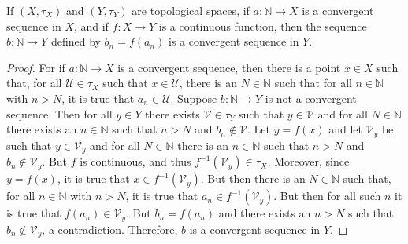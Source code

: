    \begin{theorem}
        If $(X,\tau_{X})$ and $(Y,\tau_{Y})$ are topological spaces, if
        $a:\mathbb{N}\rightarrow{X}$ is a convergent sequence in $X$, and if
        $f:X\rightarrow{Y}$ is a continuous function, then the sequence
        $b:\mathbb{N}\rightarrow{Y}$ defined by $b_{n}=f(a_{n})$ is a convergent
        sequence in $Y$.
    \end{theorem}
    \begin{proof}
        For if $a:\mathbb{N}\rightarrow{X}$ is a convergent sequence, then there
        is a point $x\in{X}$ such that, for all $\mathcal{U}\in\tau_{X}$ such
        that $x\in\mathcal{U}$, there is an $N\in\mathbb{N}$ such that for all
        $n\in\mathbb{N}$ with $n>N$, it is true that $a_{n}\in\mathcal{U}$.
        Suppose $b:\mathbb{N}\rightarrow{Y}$ is not a convergent sequence. Then
        for all $y\in{Y}$ there exists $\mathcal{V}\in\tau_{Y}$ such that
        $y\in\mathcal{V}$ and for all $N\in\mathbb{N}$ there exists an
        $n\in\mathbb{N}$ such that $n>N$ and $b_{n}\notin\mathcal{V}$. Let
        $y=f(x)$ and let $\mathcal{V}_{y}$ be such that $y\in\mathcal{V}_{y}$
        and for all $N\in\mathbb{N}$ there is an $n\in\mathbb{N}$ such that
        $n>N$ and $b_{n}\notin\mathcal{V}_{y}$. But $f$ is continuous, and thus
        $f^{\minus{1}}(\mathcal{V}_{y})\in\tau_{X}$. Moreover, since $y=f(x)$,
        it is true that $x\in{f}^{\minus{1}}(\mathcal{V}_{y})$. But then there
        is an $N\in\mathbb{N}$ such that, for all $n\in\mathbb{N}$ with $n>N$,
        it is true that $a_{n}\in{f}^{\minus{1}}(\mathcal{V}_{y})$. But then
        for all such $n$ it is true that $f(a_{n})\in\mathcal{V}_{y}$. But
        $b_{n}=f(a_{n})$ and there exists an $n>N$ such that
        $b_{n}\notin\mathcal{V}_{y}$, a contradiction. Therefore, $b$ is a
        convergent sequence in $Y$.
    \end{proof}
